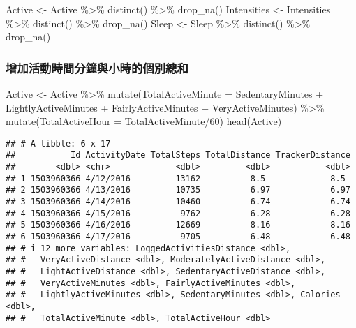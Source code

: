 \documentclass[
]{article}
\newenvironment{Shaded}{\begin{snugshade}}{\end{snugshade}}
\newcommand{\AttributeTok}[1]{\textcolor[rgb]{0.77,0.63,0.00}{#1}}
\newcommand{\DecValTok}[1]{\textcolor[rgb]{0.00,0.00,0.81}{#1}}
\newcommand{\FunctionTok}[1]{\textcolor[rgb]{0.00,0.00,0.00}{#1}}
\newcommand{\NormalTok}[1]{#1}
\newcommand{\OtherTok}[1]{\textcolor[rgb]{0.56,0.35,0.01}{#1}}
\newcommand{\SpecialCharTok}[1]{\textcolor[rgb]{0.00,0.00,0.00}{#1}}
\begin{document}
\begin{Shaded}
\begin{Highlighting}[]
\NormalTok{Active }\OtherTok{\textless{}{-}}\NormalTok{ Active }\SpecialCharTok{\%\textgreater{}\%} \FunctionTok{distinct}\NormalTok{() }\SpecialCharTok{\%\textgreater{}\%} \FunctionTok{drop\_na}\NormalTok{()}
\NormalTok{Intensities }\OtherTok{\textless{}{-}}\NormalTok{ Intensities }\SpecialCharTok{\%\textgreater{}\%} \FunctionTok{distinct}\NormalTok{() }\SpecialCharTok{\%\textgreater{}\%} \FunctionTok{drop\_na}\NormalTok{()}
\NormalTok{Sleep }\OtherTok{\textless{}{-}}\NormalTok{ Sleep }\SpecialCharTok{\%\textgreater{}\%} \FunctionTok{distinct}\NormalTok{() }\SpecialCharTok{\%\textgreater{}\%} \FunctionTok{drop\_na}\NormalTok{()}
\end{Highlighting}
\end{Shaded}

\hypertarget{ux589eux52a0ux6d3bux52d5ux6642ux9593ux5206ux9418ux8207ux5c0fux6642ux7684ux500bux5225ux7e3dux548c}{%
\subsubsection{增加活動時間分鐘與小時的個別總和}\label{ux589eux52a0ux6d3bux52d5ux6642ux9593ux5206ux9418ux8207ux5c0fux6642ux7684ux500bux5225ux7e3dux548c}}

\begin{Shaded}
\begin{Highlighting}[]
\NormalTok{Active }\OtherTok{\textless{}{-}}\NormalTok{ Active }\SpecialCharTok{\%\textgreater{}\%} 
  \FunctionTok{mutate}\NormalTok{(}\AttributeTok{TotalActiveMinute =}\NormalTok{ SedentaryMinutes }\SpecialCharTok{+}\NormalTok{ LightlyActiveMinutes }\SpecialCharTok{+}\NormalTok{       FairlyActiveMinutes }\SpecialCharTok{+}\NormalTok{ VeryActiveMinutes) }\SpecialCharTok{\%\textgreater{}\%} 
  \FunctionTok{mutate}\NormalTok{(}\AttributeTok{TotalActiveHour =}\NormalTok{ TotalActiveMinute}\SpecialCharTok{/}\DecValTok{60}\NormalTok{)  }
\FunctionTok{head}\NormalTok{(Active)}
\end{Highlighting}
\end{Shaded}

\begin{verbatim}
## # A tibble: 6 x 17
##           Id ActivityDate TotalSteps TotalDistance TrackerDistance
##        <dbl> <chr>             <dbl>         <dbl>           <dbl>
## 1 1503960366 4/12/2016         13162          8.5             8.5 
## 2 1503960366 4/13/2016         10735          6.97            6.97
## 3 1503960366 4/14/2016         10460          6.74            6.74
## 4 1503960366 4/15/2016          9762          6.28            6.28
## 5 1503960366 4/16/2016         12669          8.16            8.16
## 6 1503960366 4/17/2016          9705          6.48            6.48
## # i 12 more variables: LoggedActivitiesDistance <dbl>,
## #   VeryActiveDistance <dbl>, ModeratelyActiveDistance <dbl>,
## #   LightActiveDistance <dbl>, SedentaryActiveDistance <dbl>,
## #   VeryActiveMinutes <dbl>, FairlyActiveMinutes <dbl>,
## #   LightlyActiveMinutes <dbl>, SedentaryMinutes <dbl>, Calories <dbl>,
## #   TotalActiveMinute <dbl>, TotalActiveHour <dbl>
\end{verbatim}
\end{document}
